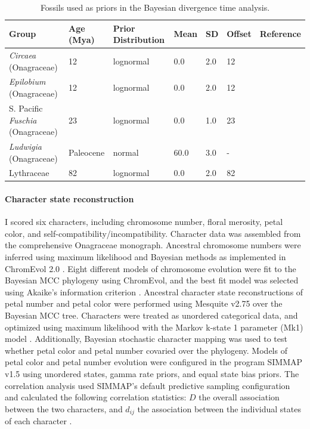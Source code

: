 \documentclass[review]{elsarticle}
\begin{document}
\begin{table}
   \center
   \begin{adjustbox}{max width=\textwidth}
      \begin{tabular}{lllllll}
         \toprule
         Group & Age (Mya) & Prior Distribution & Mean & SD & Offset & Reference \\ 
	 \midrule
         \textit{Circaea} (Onagraceae) & 12 & lognormal & 0.0 & 2.0 & 12 & \citep{grimsson} \\
         \textit{Epilobium} (Onagraceae) & 12 & lognormal & 0.0 & 2.0 & 12 & \citep{grimsson} \\
         S. Pacific \textit{Fuschia} (Onagraceae) & 23 & lognormal & 0.0 & 1.0 & 23 & \citep{lee2013fossil} \\
         \textit{Ludwigia} (Onagraceae) & Paleocene & normal & 60.0 & 3.0 & - & \citep{zhi} \\
         Lythraceae & 82 & lognormal & 0.0 & 2.0 & 82 & \citep{graham} \\
         \bottomrule
      \end{tabular}
   \end{adjustbox}
   \caption{Fossils used as priors in the Bayesian divergence time analysis.}
   \label{fossils}
\end{table}

\paragraph{Character state reconstruction}
I scored six characters, including
chromosome number, floral merosity, petal color, and self-compatibility/incompatibility. 
Character data was assembled from the comprehensive \citet{wagner2007revised} Onagraceae monograph.
Ancestral chromosome numbers were inferred using maximum likelihood and Bayesian methods 
as implemented in ChromEvol 2.0 \citep{chromevol}.
Eight different models of chromosome evolution were fit to the Bayesian MCC phylogeny using ChromEvol,
and the best fit model was selected using Akaike's information criterion \citep{aic}.
Ancestral character state reconstructions of petal number and petal color were performed using Mesquite v2.75 \citep{mesquite}
over the Bayesian MCC tree.
Characters were treated as unordered categorical data, and optimized using maximum likelihood
with the Markov k-state 1 parameter (Mk1) model \citep{lewis2001likelihood}.
Additionally, Bayesian stochastic character mapping \citep{Huelsenbeck2003} was used to test whether
petal color and petal number covaried over the phylogeny. 
Models of petal color and petal number evolution
were configured in the program SIMMAP v1.5 \citep{bollback2006simmap}
using unordered states, gamma rate priors, and equal state bias priors.
The correlation analysis used SIMMAP's default
predictive sampling configuration
and calculated the following correlation statistics: 
$D$ the overall association between
the two characters, and $d_{ij}$ the association between the
individual states of each character \citep{Huelsenbeck2003}.
\end{document}
